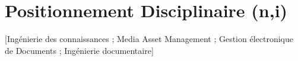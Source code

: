 \section{Positionnement Disciplinaire (n,i)}\label{sec:posd}
[Ingénierie des connaissances ; Media Asset Management ; Gestion électronique de Documents ; Ingénierie documentaire]






